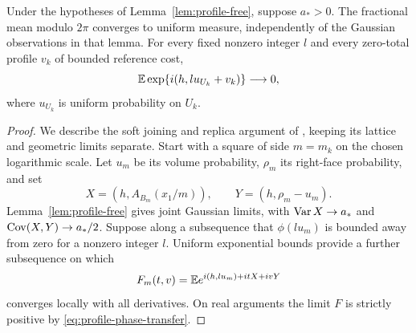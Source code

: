 \begin{lemma}\label{lem:profile-phase}
Under the hypotheses of Lemma~\ref{lem:profile-free}, suppose $a_*>0$.
The fractional mean modulo $2\pi$ converges to uniform measure,
independently of the Gaussian observations in that lemma. For every
fixed nonzero integer $l$ and every zero-total profile $v_k$ of bounded
reference cost,
\begin{equation}\label{eq:profile-phase-zero}
 \mathbb E\exp\{i(h,lu_{U_k}+v_k)\}\longrightarrow0,
\end{equation}
where $u_{U_k}$ is uniform probability on $U_k$.
\end{lemma}

\begin{proof}
We describe the soft joining and replica argument of
\cite[Theorem~2.5, Equations~(2.10)--(2.13)]{X}, keeping
its lattice and geometric limits separate. Start with a square of side
$m=m_k$ on the chosen logarithmic scale. Let $u_m$ be its volume
probability, $\rho_m$ its right-face probability, and set
\[
 X=(h,A_{B_m}(x_1/m)),\qquad Y=(h,\rho_m-u_m).
\]
Lemma~\ref{lem:profile-free} gives joint Gaussian limits, with
$\operatorname{Var} X\to a_*$ and $\operatorname{Cov}(X,Y)\to a_*/2$.
Suppose along a subsequence that $\phi(lu_m)$ is bounded away from
zero for a nonzero integer $l$. Uniform exponential bounds provide a
further subsequence on which
\[
 F_m(t,v)=\mathbb E e^{i(h,lu_m)+itX+ivY}
\]
converges locally with all derivatives. On real arguments the limit
$F$ is strictly positive by \eqref{eq:profile-phase-transfer}.


\end{proof}
